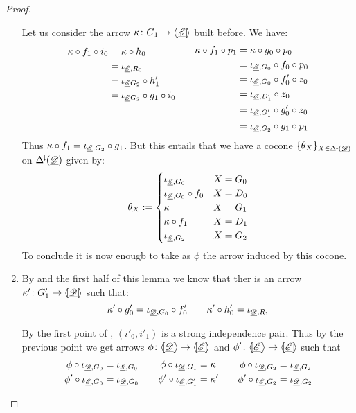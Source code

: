 \begin{proof}
\begin{enumerate}
Let us consider the arrow $\kappa\colon G_1\to \langle \hspace{-1.85pt}[ \underline{\mathscr{E}}]\hspace{-1.85pt}\rangle$ built before. We have:
\[	\begin{split}
	\kappa \circ f_1\circ i_0&=\kappa\circ h_0\\&=\iota_{\underline{\mathscr{E}},R_0}\\&=\iota_{\underline{\mathscr{E}}{G_2}}\circ h'_1\\&=\iota_{\underline{\mathscr{E}}{G_2}}\circ g_1\circ i_0\\ & \\&
\end{split}\qquad 
\begin{split}
\kappa\circ f_1\circ p_1&=\kappa \circ g_0\circ p_0\\&=\iota_{\underline{\mathscr{E}},G_0}\circ f_0\circ p_0\\&=\iota_{\underline{\mathscr{E}},G_0}\circ f'_0\circ z_0\\&=\iota_{\underline{\mathscr{E}}, D'_1} \circ z_0\\&=\iota_{\underline{\mathscr{E}}, G'_1}\circ g'_0 \circ z_0\\&=\iota_{\underline{\mathscr{E}}, G_2}\circ g_1\circ p_1
\end{split}
\]
Thus $\kappa\circ f_1=\iota_{\underline{\mathscr{E}}, G_2}\circ g_1$. But this entails that we have a cocone $\{\theta_X\}_{X\in \Delta^{\hspace{-1pt}\downarrow\hspace{-1pt}}(\underline{\mathscr{D}})}$ on $\Delta^{\hspace{-1pt}\downarrow\hspace{-1pt}}(\underline{\mathscr{D}})$ given by:
\[\theta_X:=\begin{cases}
\iota_{\underline{\mathscr{E}}, G_0} & X=G_0\\
	\iota_{\underline{\mathscr{E}}, G_0}\circ f_0 & X=D_0\\
	\kappa & X=G_1\\
	\kappa \circ f_1 & X=D_1\\
	\iota_{\underline{\mathscr{E}}, G_2} & X=G_2
\end{cases}\]
To conclude it is now enougb to take as $\phi$ the arrow induced by this cocone.
	
		\item By  and the first half of this lemma we know that ther is an arrow $\kappa'\colon G'_1\to \langle \hspace{-1.85pt}[ \underline{\mathscr{D}}]\hspace{-1.85pt}\rangle$ such that:
				\[\kappa' \circ g'_{0} = \iota_{\underline{\mathscr{D}}, G_0}\circ f'_{0} \qquad \kappa'\circ h'_{0}= \iota_{\underline{\mathscr{D}}, R_1}\]
		
		By the first point of , $(i'_0,i'_1)$ is a strong independence pair. Thus by the previous point we get arrows $\phi\colon \langle \hspace{-1.85pt}[ \underline{\mathscr{D}}]\hspace{-1.85pt}\rangle\to \langle \hspace{-1.85pt}[ \underline{\mathscr{E}}]\hspace{-1.85pt}\rangle$ and $\phi'\colon \langle \hspace{-1.85pt}[ \underline{\mathscr{E}}]\hspace{-1.85pt}\rangle\to \langle \hspace{-1.85pt}[ \underline{\mathscr{E}}]\hspace{-1.85pt}\rangle$ such that
			\[\begin{split}\phi \circ \iota_{\underline{\mathscr{D}}, G_0}&=\iota_{\underline{\mathscr{E}}, G_0} \\  \phi' \circ \iota_{\underline{\mathscr{E}}, G_0}&=\iota_{\underline{\mathscr{D}}, G_0} \end{split} \qquad \begin{split}\phi \circ \iota_{\underline{\mathscr{D}}, G_1}&=\kappa \\\phi' \circ \iota_{\underline{\mathscr{E}}, G'_1}&=\kappa'  \end{split} \qquad \begin{split} \phi\circ \iota_{\underline{\mathscr{D}}, G_2}&=\iota_{\underline{\mathscr{E}}, G_2}\\  \phi'\circ \iota_{\underline{\mathscr{E}}, G_2}&=\iota_{\underline{\mathscr{D}}, G_2}\end{split}   \]
	

\end{enumerate}
\end{proof}
